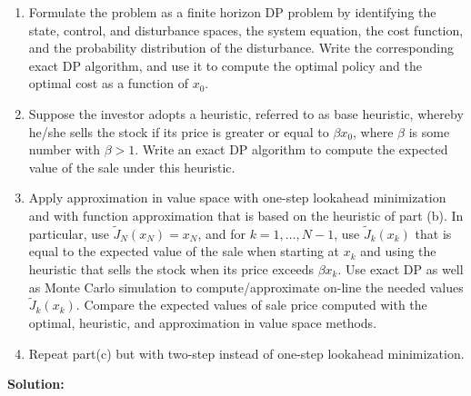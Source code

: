 \documentclass[11pt]{article}
\newcommand{\Sol}{\par {\bf Solution:}}
\begin{document}
\begin{enumerate}[label=(\alph*)]
    \item Formulate the problem as a finite horizon DP problem by identifying the state, control, and disturbance spaces, the system equation, the cost function, and the probability distribution of the disturbance. Write the corresponding exact DP algorithm, and use it to compute the optimal policy and the optimal cost as a function of $x_0$.
    \item Suppose the investor adopts a heuristic, referred to as base heuristic, whereby he/she sells the stock if its price is greater or equal to $\beta x_0$, where $\beta$ is some number with $\beta > 1$. Write an exact DP algorithm to compute the expected value of the sale under this heuristic.
    \item Apply approximation in value space with one-step lookahead minimization and with function approximation that is based on the heuristic of part (b). In particular, use $ \tilde J_N(x_N) = x_N$, and for $k = 1, \dots ,N -1$, use $\tilde J_k(x_k)$ that is equal to the expected value of the sale when starting at $x_k$ and using the heuristic that sells the stock when its price exceeds $\beta x_k$. Use exact DP as well as Monte Carlo simulation to compute/approximate on-line the needed values $\tilde J_k(x_k)$. Compare the expected values of sale price computed with the optimal, heuristic, and approximation in value space methods.
    \item Repeat part(c) but with two-step instead of one-step lookahead minimization.
\end{enumerate}

\Sol
\end{document}
